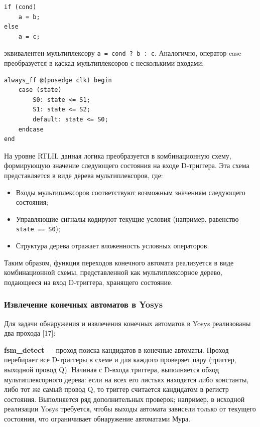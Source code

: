 \begin{lstlisting}
if (cond)
    a = b;
else
    a = c;
\end{lstlisting}

эквивалентен мультиплексору \texttt{a = cond ? b : c}. Аналогично, оператор case преобразуется в каскад
мультиплексоров с несколькими входами:

\begin{lstlisting}
always_ff @(posedge clk) begin
    case (state)
        S0: state <= S1;
        S1: state <= S2;
        default: state <= S0;
    endcase
end
\end{lstlisting}

На уровне RTLIL данная логика преобразуется в комбинационную схему, формирующую значение следующего
состояния на входе D-триггера. Эта схема представляется в виде дерева мультиплексоров, где:

\begin{itemize}
\item Входы мультиплексоров соответствуют возможным значениям следующего состояния;
\item Управляющие сигналы кодируют текущие условия (например, равенство \texttt{state == S0});
\item Структура дерева отражает вложенность условных операторов.
\end{itemize}

Таким образом, функция переходов конечного автомата реализуется в виде комбинационной схемы, представленной
как мультиплексорное дерево, подающееся на вход D-триггера, хранящего состояние.

\subsubsection{Извлечение конечных автоматов в Yosys}

Для задачи обнаружения и извлечения конечных автоматов в Yosys реализованы два прохода [17]:

\textbf{fsm\_detect} — проход поиска кандидатов в конечные автоматы. Проход перебирает все
D-триггеры в схеме и для каждого проверяет пару (триггер, выходной провод Q). Начиная с D-входа
триггера, выполняется обход мультиплексорного дерева: если на всех его листьях находятся либо
константы, либо тот же самый провод Q, то триггер считается кандидатом в регистр состояния.
Выполняется ряд дополнительных проверок; например, в исходной реализации Yosys требуется, чтобы
выходы автомата зависели только от текущего состояния, что ограничивает обнаружение автоматами Мура.

